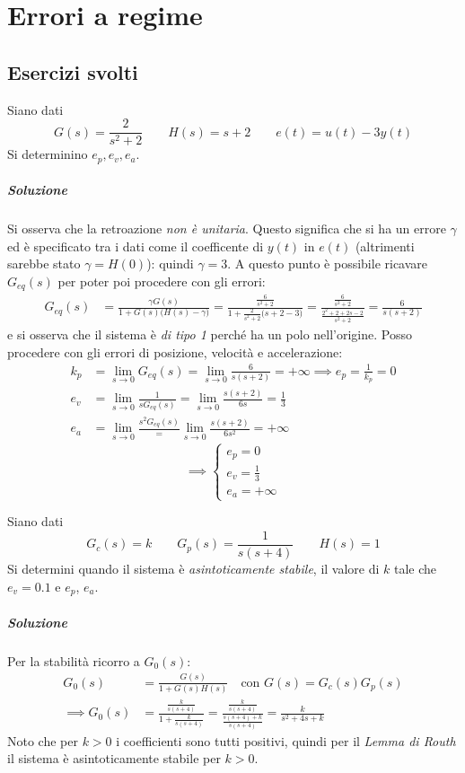\chapter{Errori a regime}

\section{Esercizi svolti}
\exercise{}
Siano dati
\[
	G(s) = \frac{2}{s^2+2} \qquad H(s) = s+2 \qquad e(t) = u(t) -3y(t)
\]
Si determinino \(e_p, e_v, e_a\).

\paragraph{Soluzione}
Si osserva che la retroazione \emph{non è unitaria}. Questo significa che si ha un errore \(\gamma\) ed è specificato tra i dati come il coefficente di \(y(t)\) in \(e(t)\) (altrimenti sarebbe stato \(\gamma = H(0)\)): quindi \(\gamma = 3\).
A questo punto è possibile ricavare \(G_{eq}(s)\) per poter poi procedere con gli errori:
\begin{align*}
	G_{eq}(s) &= \frac{\gamma G(s)}{1+G(s)\bigl(H(s)-\gamma\bigr)} =
			\frac{\frac{6}{s^2+2}}{1+\frac{2}{s^2+2}\bigl(s+2-3\bigr)} =
			\frac{\frac{6}{s^2+2}}{\frac{2^2+2+2s-2}{s^2+2}} =
		  	\frac{6}{s(s+2)}
\end{align*}
e si osserva che il sistema è \emph{di tipo 1} perché ha un polo nell'origine.
Posso procedere con gli errori di posizione, velocità e accelerazione:
\begin{align*}
	k_p &= \lim_{s\to0} G_{eq}(s) = \lim_{s\to0} \frac{6}{s(s+2)} = +\infty \implies e_p = \frac{1}{k_p} = 0 \\
	e_v &= \lim_{s\to0} \frac{1}{s G_{eq}(s)} = \lim_{s\to0} \frac{s(s+2)}{6s} = \frac{1}{3} \\
	e_a &= \lim_{s\to0} \frac{s^2 G_{eq}(s)} = \lim_{s\to0} \frac{s(s+2)}{6s^2} = +\infty
\end{align*}
\[\implies \begin{cases}
	e_p = 0 \\
	e_v = \frac{1}{3} \\
	e_a = +\infty
\end{cases}\]


\exercise{}
Siano dati
\[
	G_c(s) = k \qquad G_p(s) = \frac{1}{s(s+4)} \qquad H(s) = 1
\]
Si determini quando il sistema è \emph{asintoticamente stabile}, il valore di \(k\) tale che \(e_v = 0.1\) e \(e_p\), \(e_a\).

\paragraph{Soluzione}
Per la stabilità ricorro a \(G_0(s)\):
\begin{align*}
	G_0(s) &= \frac{G(s)}{1+G(s)H(s)} \quad \text{con } G(s) = G_c(s)G_p(s) \\
	\implies G_0(s) &= \frac{\frac{k}{s(s+4)}}{1+\frac{k}{s(s+4)}} =
		\frac{\frac{k}{s(s+4)}}{\frac{s(s+4)+k}{s(s+4)}} =
		\frac{k}{s^2+4s+k}
\end{align*}
Noto che per \(k>0\) i coefficienti sono tutti positivi, quindi per il \emph{Lemma di Routh} il sistema è asintoticamente stabile per \(k>0\).

